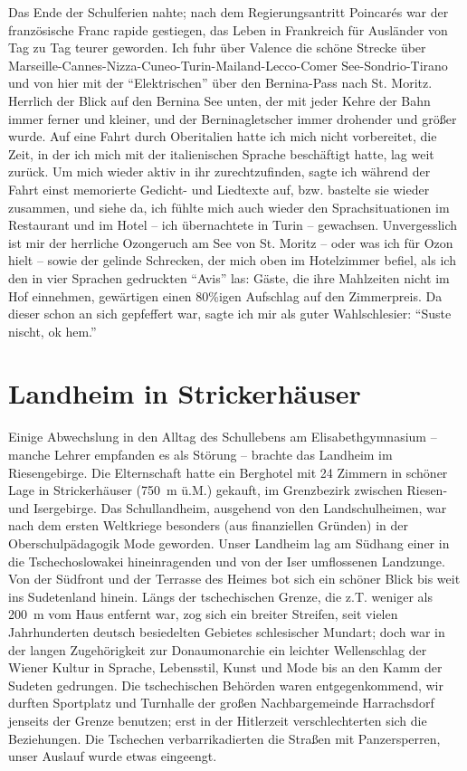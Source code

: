 \documentclass[a5paper,pagesize,10pt,twoside=true]{scrbook}
\renewcommand{\marginpar}[2][]{}
\begin{document}
Das Ende der Schulferien nahte; nach dem Regierungsantritt Poincarés war der französische Franc rapide gestiegen, das Leben in Frankreich für Ausländer von Tag zu Tag teurer geworden. Ich fuhr über Valence die schöne Strecke über Marseille-Cannes-Nizza-Cuneo-Turin-Mailand-Lecco-Comer See-Sondrio-Tirano und von hier mit der \enquote{Elektrischen} über den Bernina-Pass nach St. Moritz. Herrlich der Blick auf den Bernina See unten, der mit jeder Kehre der Bahn immer ferner und kleiner, und der Berninagletscher immer drohender und größer wurde. Auf eine Fahrt durch Oberitalien hatte ich mich nicht vorbereitet, die Zeit, in der ich mich mit der italienischen Sprache beschäftigt hatte, lag weit zurück. Um mich wieder aktiv in ihr zurechtzufinden, sagte ich während der Fahrt einst memorierte Gedicht- und Liedtexte auf, bzw. bastelte sie wieder zusammen, und siehe da, ich fühlte mich auch wieder den Sprachsituationen im Restaurant und im Hotel -- ich übernachtete in Turin -- gewachsen. Unvergesslich ist mir der herrliche Ozongeruch am See von St. Moritz -- oder was ich für Ozon hielt -- sowie der gelinde Schrecken, der mich oben im Hotelzimmer befiel, als ich den in vier Sprachen gedruckten \enquote{Avis} las: Gäste, die ihre Mahlzeiten nicht im Hof einnehmen, gewärtigen einen 80\%igen Aufschlag auf den Zimmerpreis. Da dieser schon an sich gepfeffert war, sagte ich mir als guter Wahlschlesier: \enquote{Suste nischt, ok hem.}

\marginpar{Ende des Heft 4 am 31.3.02 in Barnave, Heft 5 begonnen 2.4.02}

\section{Landheim in Strickerhäuser}
Einige Abwechslung in den Alltag des Schullebens am Elisabethgymnasium -- manche Lehrer empfanden es als Störung -- brachte das Landheim im Riesengebirge. Die Elternschaft hatte ein Berghotel mit 24 Zimmern in schöner Lage in Strickerhäuser (750~m ü.M.) gekauft, im Grenzbezirk zwischen Riesen- und Isergebirge. Das Schullandheim, ausgehend von den Landschulheimen, war nach dem ersten Weltkriege besonders (aus finanziellen Gründen) in der Oberschulpädagogik Mode geworden. Unser Landheim lag am Südhang einer in die Tschechoslowakei hineinragenden und von der Iser umflossenen Landzunge. Von der Südfront und der Terrasse des Heimes bot sich ein schöner Blick bis weit ins Sudetenland hinein. Längs der tschechischen Grenze, die z.T. weniger als 200~m vom Haus entfernt war, zog sich ein breiter Streifen, seit vielen Jahrhunderten deutsch besiedelten Gebietes schlesischer Mundart; doch war in der langen Zugehörigkeit zur Donaumonarchie ein leichter Wellenschlag der Wiener Kultur in Sprache, Lebensstil, Kunst und Mode bis an den Kamm der Sudeten gedrungen. Die tschechischen Behörden waren entgegenkommend, wir durften Sportplatz und Turnhalle der großen Nachbargemeinde Harrachsdorf jenseits der Grenze benutzen; erst in der Hitlerzeit verschlechterten sich die Beziehungen. Die Tschechen verbarrikadierten die Straßen mit Panzersperren, unser Auslauf wurde etwas eingeengt.
\end{document}
